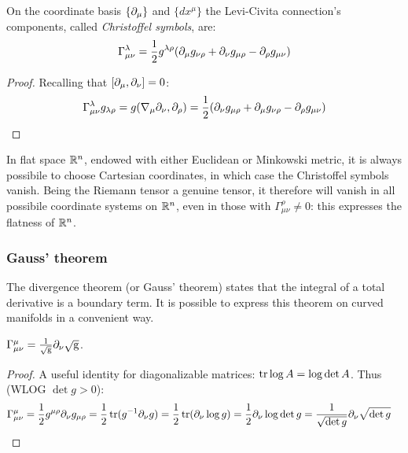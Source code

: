 \begin{proposition}
  On the coordinate basis $ \{\partial_\mu\} $ and $ \{dx^\mu\} $ the Levi-Civita connection's components, called \textit{Christoffel symbols}, are:
  \begin{equation}
    \Gamma^\lambda_{\mu \nu} = \frac{1}{2} g^{\lambda \rho} (\partial_\mu g_{\nu \rho} + \partial_\nu g_{\mu \rho} - \partial_\rho g_{\mu \nu})
    \label{eq:3.40}
  \end{equation}
\end{proposition}
\begin{proof}
  Recalling that $ [\partial_\mu, \partial_\nu] = 0 $:
  \begin{equation*}
    \Gamma^\lambda_{\mu \nu} g_{\lambda \rho} = g(\nabla_\mu \partial_\nu, \partial_\rho) = \frac{1}{2} (\partial_\nu g_{\mu \rho} + \partial_\mu g_{\nu \rho} - \partial_\rho g_{\mu \nu})
  \end{equation*}
\end{proof}

\begin{example}
  In flat space $ \mathbb{R}^n $, endowed with either Euclidean or Minkowski metric, it is always possibile to choose Cartesian coordinates, in which case the Christoffel symbols vanish. Being the Riemann tensor a genuine tensor, it therefore will vanish in all possibile coordinate systems on $ \mathbb{R}^n $, even in those with $ \Gamma^\rho_{\mu \nu} \neq 0 $: this expresses the flatness of $ \mathbb{R}^n $.
\end{example}

\subsubsection{Gauss' theorem}

The divergence theorem (or Gauss' theorem) states that the integral of a total derivative is a boundary term. It is possible to express this theorem on curved manifolds in a convenient way.

\begin{lemma}\label{gauss-lemma}
  $ \Gamma^\mu_{\mu \nu} = \frac{1}{\sqrt{\mathrm{g}}} \partial_\nu \sqrt{\mathrm{g}} $.
\end{lemma}
\begin{proof}
  A useful identity for diagonalizable matrices: $ \operatorname{tr} \log A = \log \det A $. Thus (WLOG $ \det g > 0 $):
  \begin{equation*}
    \begin{split}
      \Gamma^\mu_{\mu \nu}
      &= \frac{1}{2} g^{\mu \rho} \partial_\nu g_{\mu \rho} = \frac{1}{2} \operatorname{tr} (g^{-1} \partial_\nu g) = \frac{1}{2} \operatorname{tr} (\partial_\nu \log g) = \frac{1}{2} \partial_\nu \log \det g = \frac{1}{\sqrt{\det g}} \partial_\nu \sqrt{\det g}
    \end{split}
  \end{equation*}
\end{proof}

